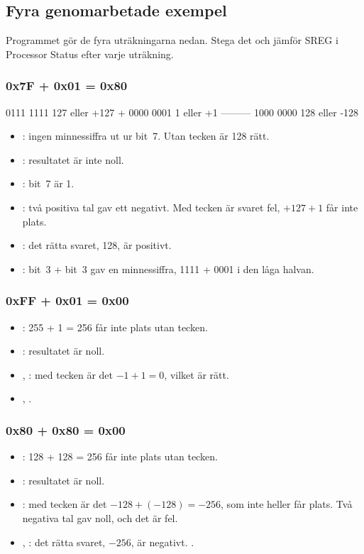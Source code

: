 \subsection{Fyra genomarbetade exempel}
\label{c8:a7}
Programmet  gör de fyra uträkningarna nedan. Stega det och jämför SREG i
Processor Status efter varje uträkning.


\subsubsection{0x7F + 0x01 = 0x80}

\begin{textdrawing}
   0111 1111    127  eller  +127
 + 0000 0001      1  eller    +1
   ---------
   1000 0000    128  eller  -128
\end{textdrawing}

\begin{itemize}
  \item {}: ingen minnessiffra ut ur bit~7. Utan tecken är 128 rätt.
  \item {}: resultatet är inte noll.
  \item {}: bit~7 är 1.
  \item {}: två positiva tal gav ett negativt. Med tecken är svaret fel, $+127 + 1$ får
    inte plats.
  \item {}: det rätta svaret, 128, är positivt.
  \item {}: bit~3 + bit~3 gav en minnessiffra, 1111 + 0001 i den låga halvan.
\end{itemize}

\subsubsection{0xFF + 0x01 = 0x00}
\begin{itemize}
  \item {}: 255 + 1 = 256 får inte plats utan tecken.
  \item {}: resultatet är noll.
  \item {}, : med tecken är det $-1 + 1 = 0$, vilket är rätt.
  \item {}, .
\end{itemize}

\subsubsection{0x80 + 0x80 = 0x00}
\begin{itemize}
  \item {}: 128 + 128 = 256 får inte plats utan tecken.
  \item {}: resultatet är noll.
  \item {}: med tecken är det $-128 + (-128) = -256$, som inte heller får plats. Två
    negativa tal gav noll, och det är fel.
  \item {}, : det rätta svaret, $-256$, är negativt. .
\end{itemize}

